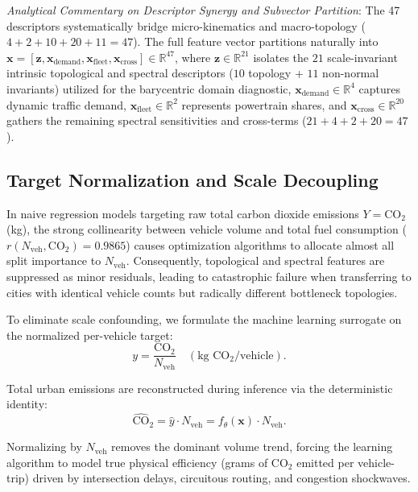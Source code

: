 \documentclass[journal]{IEEEtran}
\begin{document}
\textit{Analytical Commentary on Descriptor Synergy and Subvector Partition}:
The 47 descriptors systematically bridge micro-kinematics and macro-topology ($4 + 2 + 10 + 20 + 11 = 47$). The full feature vector partitions naturally into $\mathbf{x} = [\mathbf{z}, \mathbf{x}_{\text{demand}}, \mathbf{x}_{\text{fleet}}, \mathbf{x}_{\text{cross}}] \in \mathbb{R}^{47}$, where $\mathbf{z} \in \mathbb{R}^{21}$ isolates the $21$ scale-invariant intrinsic topological and spectral descriptors ($10$ topology + $11$ non-normal invariants) utilized for the barycentric domain diagnostic, $\mathbf{x}_{\text{demand}} \in \mathbb{R}^4$ captures dynamic traffic demand, $\mathbf{x}_{\text{fleet}} \in \mathbb{R}^2$ represents powertrain shares, and $\mathbf{x}_{\text{cross}} \in \mathbb{R}^{20}$ gathers the remaining spectral sensitivities and cross-terms ($21 + 4 + 2 + 20 = 47$).

\subsection{Target Normalization and Scale Decoupling}
In naive regression models targeting raw total carbon dioxide emissions $Y = \text{CO}_2$ (kg), the strong collinearity between vehicle volume and total fuel consumption ($r(N_{\text{veh}}, \text{CO}_2) = 0.9865$) causes optimization algorithms to allocate almost all split importance to $N_{\text{veh}}$. Consequently, topological and spectral features are suppressed as minor residuals, leading to catastrophic failure when transferring to cities with identical vehicle counts but radically different bottleneck topologies.

To eliminate scale confounding, we formulate the machine learning surrogate on the normalized per-vehicle target:
\begin{equation}
y = \frac{\text{CO}_2}{N_{\text{veh}}} \quad (\text{kg } \text{CO}_2 / \text{vehicle}).
\label{eq:normalized_target}
\end{equation}

Total urban emissions are reconstructed during inference via the deterministic identity:
\begin{equation}
\widehat{\text{CO}}_2 = \hat{y} \cdot N_{\text{veh}} = f_\theta(\mathbf{x}) \cdot N_{\text{veh}}.
\label{eq:reconstructed_target}
\end{equation}

Normalizing by $N_{\text{veh}}$ removes the dominant volume trend, forcing the learning algorithm to model true physical efficiency (grams of $\text{CO}_2$ emitted per vehicle-trip) driven by intersection delays, circuitous routing, and congestion shockwaves.
\end{document}
